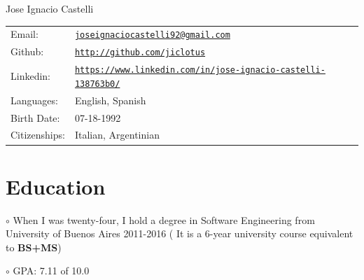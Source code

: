 \documentclass[letterpaper]{article}
\def\name{Jose Ignacio Castelli}
\newenvironment{no-indent-itemize}{
  \begin{list}{}{
    \setlength{\leftmargin}{0em}
  }
}{
  \end{list}
}
\def\bullet{$\circ$\xspace}
\begin{document}
{\huge \name}



\bigskip
\begin{minipage}{0.45\linewidth}
  \begin{tabular}{llll}
    
    
    Email: & \href{mailto:joseignaciocastelli92@gmail.com}{\tt joseignaciocastelli92@gmail.com} \\
     
    
    Github: &\href{http://github.com/jiclotus}{\tt http://github.com/jiclotus}\\
    
    Linkedin: &\href{https://www.linkedin.com/in/jose-ignacio-castelli-138763b0/}{\tt https://www.linkedin.com/in/jose-ignacio-castelli-138763b0/}\\
    
    Languages: & English, Spanish\\
    Birth Date: & \textsc{07-18-1992} \\
    Citizenships: & Italian, Argentinian
    
  \end{tabular}
\end{minipage}


\hfill 
{}


\section*{Education}
\begin{no-indent-itemize}
  \item\bullet When I was twenty-four, I hold a degree in Software Engineering from University of Buenos Aires 2011-2016 ( It is a 6-year university course equivalent to \textbf{BS+MS}) 
  \item\bullet GPA: 7.11 of 10.0
\end{no-indent-itemize}
\end{document}

